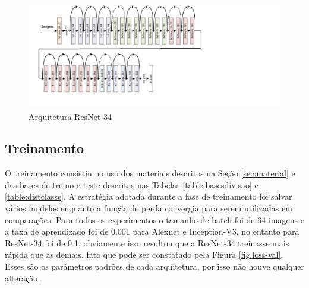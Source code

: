 \begin{figure}
\centering
\includegraphics[scale=0.83]{figuras/resnet-34.png}
\caption{Arquitetura ResNet-34}
\label{fig:resnet-34}
\end{figure}



\subsection{Treinamento}
O treinamento consistiu no uso dos materiais descritos na Seção \ref{sec:material} e das bases de treino e teste descritas nas Tabelas \ref{table:basesdivisao} e \ref{table:distclasse}. A estratégia adotada durante a fase de treinamento foi salvar vários modelos enquanto a função de perda convergia para serem utilizadas em comparações. Para todos os experimentos o tamanho de batch foi de 64 imagens e a taxa de aprendizado foi de 0.001 para Alexnet e Inception-V3, no entanto para ResNet-34 foi de 0.1, obviamente isso resultou que a ResNet-34 treinasse mais rápida que as demais, fato que pode ser constatado pela Figura \ref{fig:loss-val}. Esses são os parâmetros padrões de cada arquitetura, por isso não houve qualquer alteração. 




